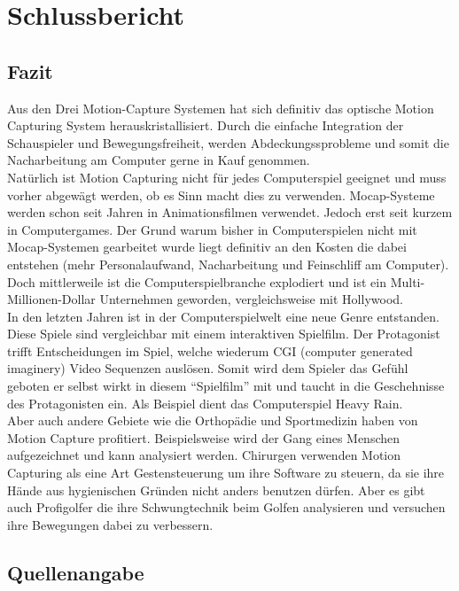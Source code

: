 \chapter{Schlussbericht}

\section{Fazit}
Aus den Drei Motion-Capture Systemen hat sich definitiv das optische Motion Capturing System herauskristallisiert. Durch die einfache Integration der Schauspieler und Bewegungsfreiheit, werden Abdeckungssprobleme und somit die Nacharbeitung am Computer gerne in Kauf genommen. \\
Natürlich ist Motion Capturing nicht für jedes Computerspiel geeignet und muss vorher abgewägt werden, ob es Sinn macht dies zu verwenden. Mocap-Systeme werden schon seit Jahren in Animationsfilmen verwendet. Jedoch erst seit kurzem in Computergames. Der Grund warum bisher in Computerspielen nicht mit Mocap-Systemen gearbeitet wurde liegt definitiv an den Kosten die dabei entstehen (mehr Personalaufwand, Nacharbeitung und Feinschliff am Computer). Doch mittlerweile ist die Computerspielbranche explodiert und ist ein Multi-Millionen-Dollar Unternehmen geworden, vergleichsweise mit Hollywood. \\
In den letzten Jahren ist in der Computerspielwelt eine neue Genre entstanden. Diese Spiele sind vergleichbar mit einem interaktiven Spielfilm. Der Protagonist trifft Entscheidungen im Spiel, welche wiederum CGI (computer generated imaginery) Video Sequenzen auslösen. Somit wird dem Spieler das Gefühl geboten er selbst wirkt in diesem ``Spielfilm'' mit und taucht in die Geschehnisse des Protagonisten ein. Als Beispiel dient das Computerspiel Heavy Rain.\\
Aber auch andere Gebiete wie die Orthopädie und Sportmedizin haben von Motion Capture profitiert. Beispielsweise wird der Gang eines Menschen aufgezeichnet und kann analysiert werden. Chirurgen verwenden Motion Capturing als eine Art Gestensteuerung um ihre Software zu steuern, da sie ihre Hände aus hygienischen Gründen nicht anders benutzen dürfen. Aber es gibt auch Profigolfer die ihre Schwungtechnik beim Golfen analysieren und versuchen ihre Bewegungen dabei zu verbessern.\\


\section{Quellenangabe}

